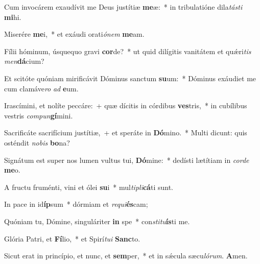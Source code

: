 ﻿Cum invocárem exaudívit me Deus justítiæ \textbf{me}æ:~* in tribulatióne dila\textit{tás}\textit{ti} \textbf{mi}hi.

Miserére \textbf{me}i,~* et exáudi orati\textit{ó}\textit{nem} \textbf{me}am.

Fílii hóminum, úsquequo gravi \textbf{cor}de?~* ut quid dilígitis vanitátem et quǽri\textit{tis} \textit{men}\textbf{dá}cium?

Et scitóte quóniam mirificávit Dóminus sanctum \textbf{su}um:~* Dóminus exáudiet me cum clamáve\textit{ro} \textit{ad} \textbf{e}um.

Irascímini, et nolíte peccáre:~+ quæ dícitis in córdibus \textbf{ves}tris,~* in cubílibus vestris \textit{com}\textit{pun}\textbf{gí}mini.

Sacrificáte sacrifícium justítiæ,~+ et speráte in \textbf{Dó}mino.~* Multi dicunt: quis osténdit \textit{no}\textit{bis} \textbf{bo}na?

Signátum est super nos lumen vultus tui, \textbf{Dó}mine:~* dedísti lætítiam in \textit{cor}\textit{de} \textbf{me}o.

A fructu fruménti, vini et ólei \textbf{su}i~* mul\textit{ti}\textit{pli}\textbf{cá}ti sunt.

In pace in id\textbf{íp}sum~* dórmiam et \textit{re}\textit{qui}\textbf{és}cam;

Quóniam tu, Dómine, singuláriter \textbf{in} spe~* con\textit{sti}\textit{tu}\textbf{ís}ti me.

Glória Patri, et \textbf{Fí}lio,~* et Spirí\textit{tu}\textit{i} \textbf{Sanc}to.

Sicut erat in princípio, et nunc, et \textbf{sem}per,~* et in sǽcula sæcu\textit{ló}\textit{rum}. \textbf{A}men.